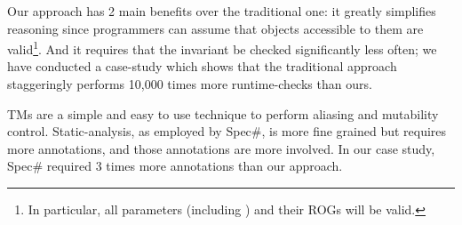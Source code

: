 Our approach has 2 main benefits over the traditional one: it greatly simplifies reasoning since programmers can assume that objects accessible to them are valid\footnote{
In particular, all parameters (including \Q@this@) and their ROGs will be valid.}. And it requires that the invariant be checked significantly less often; we have conducted a case-study which shows that the traditional approach staggeringly performs 10,000 times more runtime-checks than ours.


TMs are a simple and easy to use technique 
to perform aliasing and mutability control.
Static-analysis, as employed by Spec\#, is
more fine grained but requires more annotations, and those annotations are more involved.
 In our case study, Spec\# required 3 times more annotations than our approach.



\noindent{}

